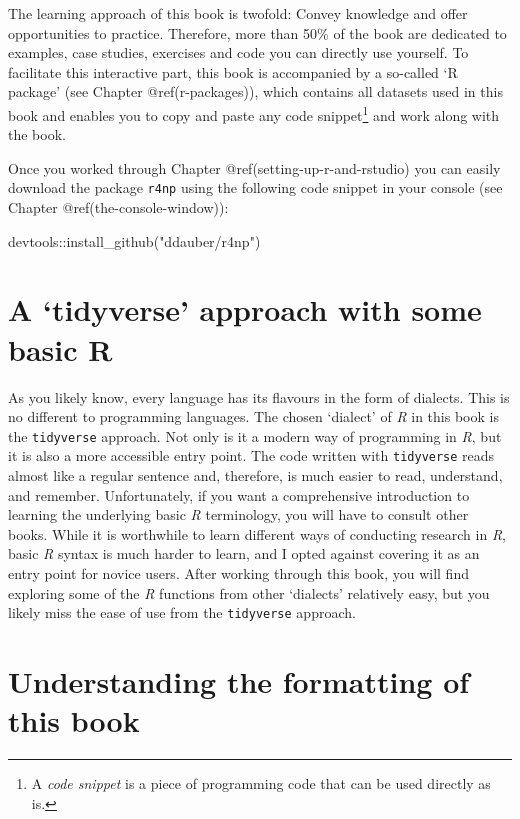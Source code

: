 \documentclass[
  letterpaper,
]{krantz}
\makeatletter
\newenvironment{Shaded}{\begin{snugshade}}{\end{snugshade}}
\newcommand{\FunctionTok}[1]{\textcolor[rgb]{0.28,0.35,0.67}{#1}}
\newcommand{\NormalTok}[1]{\textcolor[rgb]{0.00,0.23,0.31}{#1}}
\newcommand{\SpecialCharTok}[1]{\textcolor[rgb]{0.37,0.37,0.37}{#1}}
\newcommand{\StringTok}[1]{\textcolor[rgb]{0.13,0.47,0.30}{#1}}
\newenvironment{kframe}{%
\medskip{}
\setlength{\fboxsep}{.8em}
 \def\at@end@of@kframe{}%
 \ifinner\ifhmode%
  \def\at@end@of@kframe{\end{minipage}}%
  \begin{minipage}{\columnwidth}%
 \fi\fi%
 \def\FrameCommand##1{\hskip\@totalleftmargin \hskip-\fboxsep
 \colorbox{shadecolor}{##1}\hskip-\fboxsep
     \hskip-\linewidth \hskip-\@totalleftmargin \hskip\columnwidth}%
 \MakeFramed {\advance\hsize-\width
   \@totalleftmargin\z@ \linewidth\hsize
   \@setminipage}}%
 {\par\unskip\endMakeFramed%
 \at@end@of@kframe}
\renewenvironment{Shaded}{\begin{kframe}}{\end{kframe}}
\makeatother
\begin{document}
The learning approach of this book is twofold: Convey knowledge and
offer opportunities to practice. Therefore, more than 50\% of the book
are dedicated to examples, case studies, exercises and code you can
directly use yourself. To facilitate this interactive part, this book is
accompanied by a so-called `R package' (see Chapter @ref(r-packages)),
which contains all datasets used in this book and enables you to copy
and paste any code snippet\footnote{A \emph{code snippet} is a piece of
  programming code that can be used directly as is.} and work along with
the book.

Once you worked through Chapter @ref(setting-up-r-and-rstudio) you can
easily download the package \texttt{r4np} using the following code
snippet in your console (see Chapter @ref(the-console-window)):

\begin{Shaded}
\begin{Highlighting}[]
\NormalTok{devtools}\SpecialCharTok{::}\FunctionTok{install\_github}\NormalTok{(}\StringTok{"ddauber/r4np"}\NormalTok{)}
\end{Highlighting}
\end{Shaded}

\section{A `tidyverse' approach with some basic
R}\label{a-tidyverse-approach-with-some-basic-r}

As you likely know, every language has its flavours in the form of
dialects. This is no different to programming languages. The chosen
`dialect' of \emph{R} in this book is the \texttt{tidyverse} approach.
Not only is it a modern way of programming in \emph{R}, but it is also a
more accessible entry point. The code written with \texttt{tidyverse}
reads almost like a regular sentence and, therefore, is much easier to
read, understand, and remember. Unfortunately, if you want a
comprehensive introduction to learning the underlying basic \emph{R}
terminology, you will have to consult other books. While it is
worthwhile to learn different ways of conducting research in \emph{R},
basic \emph{R} syntax is much harder to learn, and I opted against
covering it as an entry point for novice users. After working through
this book, you will find exploring some of the \emph{R} functions from
other `dialects' relatively easy, but you likely miss the ease of use
from the \texttt{tidyverse} approach.

\section{Understanding the formatting of this
book}\label{formatting-of-this-book}
\end{document}
